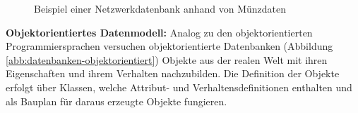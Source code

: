 \begin{figure}[h!tb]
\begin{center}
	\end{center}
	\caption{Beispiel einer Netzwerkdatenbank anhand von Münzdaten}
	\label{abb:datenbanken-netzwerk}
\end{figure}

{\bfseries Objektorientiertes Datenmodell:} Analog zu den objektorientierten Programmiersprachen versuchen objektorientierte Datenbanken (Abbildung \ref{abb:datenbanken-objektorientiert}) Objekte aus der realen Welt mit ihren Eigenschaften und ihrem Verhalten nachzubilden. Die Definition der Objekte erfolgt über Klassen, welche Attribut- und Verhaltensdefinitionen enthalten und als Bauplan für daraus erzeugte Objekte fungieren.

